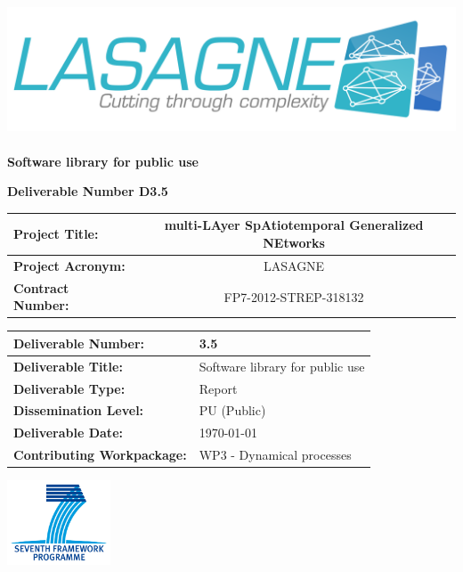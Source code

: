 \documentclass[11pt]{article}
\begin{document}
\thispagestyle{empty}

\centerline{\includegraphics[height=4cm]{LASAGNE-color-on-white_III.png}}

\vskip1.5cm
\centerline{\LARGE\bf Software library for public use}

\vskip1cm
\centerline{\Large\bf Deliverable Number D3.5}


\vskip2cm
\begin{center}
\begin{tabular}{||l|c||}%
\hline\hline
{\bf Project Title:} & multi-LAyer SpAtiotemporal Generalized NEtworks\\
\hline
{\bf Project Acronym:} & LASAGNE\\
\hline
{\bf Contract Number:} & FP7-2012-STREP-318132\\
\hline\hline
\end{tabular}

\vskip2cm
\begin{tabular}{||l|l||}
\hline\hline
{\bf Deliverable Number:} & 3.5\\
\hline
{\bf Deliverable Title:} & Software library for public use\\
\hline
{\bf Deliverable Type:} & Report\\
\hline
{\bf Dissemination Level:} & PU (Public)\\
\hline
{\bf Deliverable Date:} & \today\hspace{6.8cm}\mbox{}\\
\hline
{\bf Contributing Workpackage:} & WP3 - Dynamical processes\\
\hline\hline
\end{tabular}
\end{center}

\vskip 1.5cm
\centerline{\includegraphics[height=2.5cm]{FP7-gen-RGB.jpg}}
\end{document}
